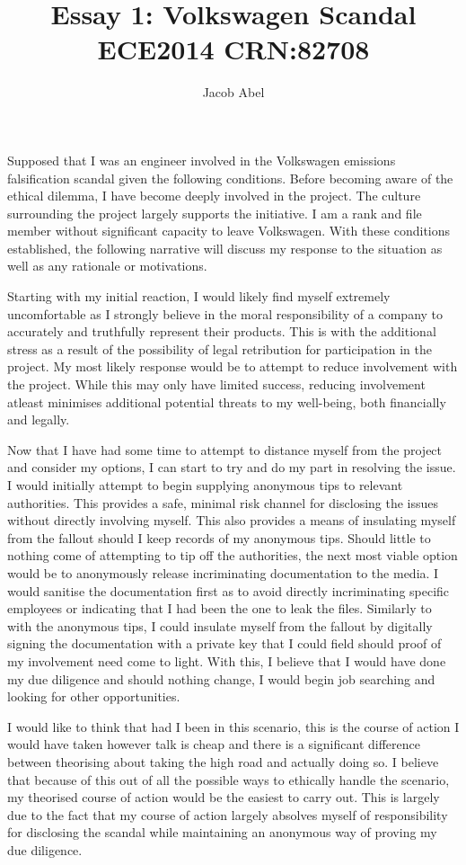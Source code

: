 \documentclass[12pt,letterpaper,titlepage]{report}
\author{Jacob Abel}
\title{%
	Essay 1: Volkswagen Scandal
	\\\large ECE2014 CRN:82708
}
\begin{document}
\maketitle
{} 

Supposed that I was an engineer involved in the Volkswagen emissions falsification scandal given the following conditions. Before becoming aware of the ethical dilemma, I have become deeply involved in the project. The culture surrounding the project largely supports the initiative. I am a rank and file member without significant capacity to leave Volkswagen. With these conditions established, the following narrative will discuss my response to the situation as well as any rationale or motivations.

Starting with my initial reaction, I would likely find myself extremely uncomfortable as I strongly believe in the moral responsibility of a company to accurately and truthfully represent their products. This is with the additional stress as a result of the possibility of legal retribution for participation in the project. My most likely response would be to attempt to reduce involvement with the project. While this may only have limited success, reducing involvement atleast minimises additional potential threats to my well-being, both financially and legally.

Now that I have had some time to attempt to distance myself from the project and consider my options, I can start to try and do my part in resolving the issue. I would initially attempt to begin supplying anonymous tips to relevant authorities. This provides a safe, minimal risk channel for disclosing the issues without directly involving myself. This also provides a means of insulating myself from the fallout should I keep records of my anonymous tips. Should little to nothing come of attempting to tip off the authorities, the next most viable option would be to anonymously release incriminating documentation to the media. I would sanitise the documentation first as to avoid directly incriminating specific employees or indicating that I had been the one to leak the files. Similarly to with the anonymous tips, I could insulate myself from the fallout by digitally signing the documentation with a private key that I could field should proof of my involvement need come to light. With this, I believe that I would have done my due diligence and should nothing change, I would begin job searching and looking for other opportunities.

I would like to think that had I been in this scenario, this is the course of action I would have taken however talk is cheap and there is a significant difference between theorising about taking the high road and actually doing so. I believe that because of this out of all the possible ways to ethically handle the scenario, my theorised course of action would be the easiest to carry out. This is largely due to the fact that my course of action largely absolves myself of responsibility for disclosing the scandal while maintaining an anonymous way of proving my due diligence. 
\end{document}
